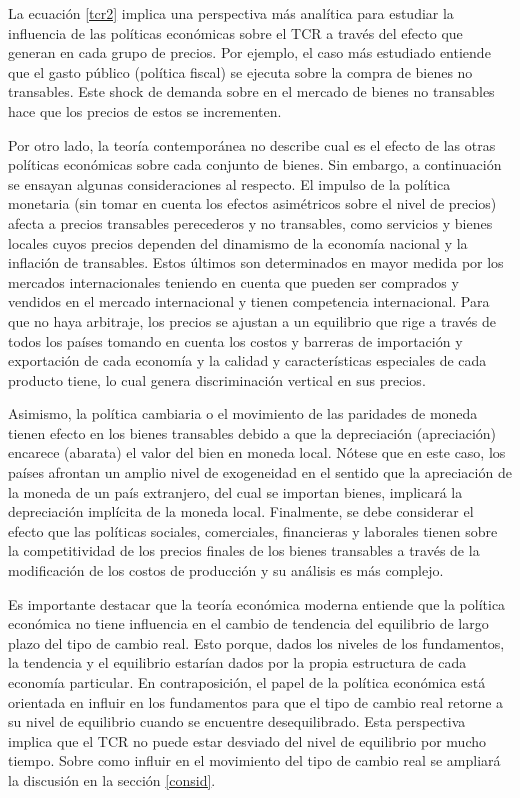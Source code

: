 \documentclass[12pt,letterpaper]{article}
\begin{document}
La ecuación \ref{tcr2} implica una perspectiva más analítica para estudiar la influencia de las políticas económicas sobre el TCR a través del efecto que generan en cada grupo de precios. Por ejemplo, el caso más estudiado entiende que el gasto público (política fiscal) se ejecuta sobre la compra de bienes no transables. Este shock de demanda sobre en el mercado de bienes no transables hace que los precios de estos se incrementen. 

Por otro lado, la teoría contemporánea no describe cual es el efecto de las otras políticas económicas sobre cada conjunto de bienes. Sin embargo, a continuación se ensayan algunas consideraciones al respecto. El impulso de la política monetaria (sin tomar en cuenta los efectos asimétricos sobre el nivel de precios) afecta a precios transables perecederos y no transables, como servicios y bienes locales cuyos precios dependen del dinamismo de la economía nacional y la inflación de transables. Estos últimos son determinados en mayor medida por los mercados internacionales teniendo en cuenta que pueden ser comprados y vendidos en el mercado internacional y tienen competencia internacional. Para que no haya arbitraje, los precios se ajustan a un equilibrio que rige a través de todos los países tomando en cuenta los costos y barreras de importación y exportación de cada economía y la calidad y características especiales de cada producto tiene, lo cual genera discriminación vertical en sus precios. 

Asimismo, la política cambiaria o el movimiento de las paridades de moneda tienen efecto en los bienes transables debido a que la depreciación (apreciación) encarece (abarata) el valor del bien en moneda local. Nótese que en este caso, los países afrontan un amplio nivel de exogeneidad en el sentido que la apreciación de la moneda de un país extranjero, del cual se importan bienes, implicará la depreciación implícita de la moneda local. Finalmente, se debe considerar el efecto que las políticas sociales, comerciales, financieras y laborales tienen sobre la competitividad de los precios finales de los bienes transables a través de la modificación de los costos de producción y su análisis es más complejo. 

Es importante destacar que la teoría económica moderna entiende que la política económica no tiene influencia en el cambio de tendencia del equilibrio de largo plazo del tipo de cambio real. Esto porque, dados los niveles de los fundamentos, la tendencia y el equilibrio estarían dados por la propia estructura de cada economía particular. En contraposición, el papel de la política económica está orientada en influir en los fundamentos para que el tipo de cambio real retorne a su nivel de equilibrio cuando se encuentre desequilibrado. Esta perspectiva implica que el TCR no puede estar desviado del nivel de equilibrio por mucho tiempo. Sobre como influir en el movimiento del tipo de cambio real se ampliará la discusión en la sección \ref{consid}.
\end{document}
